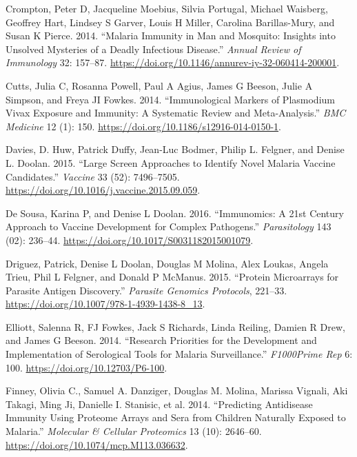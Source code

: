 \documentclass[
  a4paper]{article}
\begin{document}
\leavevmode\hypertarget{ref-crompton2014rev}{}%
Crompton, Peter D, Jacqueline Moebius, Silvia Portugal, Michael
Waisberg, Geoffrey Hart, Lindsey S Garver, Louis H Miller, Carolina
Barillas-Mury, and Susan K Pierce. 2014. ``Malaria Immunity in Man and
Mosquito: Insights into Unsolved Mysteries of a Deadly Infectious
Disease.'' \emph{Annual Review of Immunology} 32: 157--87.
\url{https://doi.org/10.1146/annurev-iy-32-060414-200001}.

\leavevmode\hypertarget{ref-cutts2014meta}{}%
Cutts, Julia C, Rosanna Powell, Paul A Agius, James G Beeson, Julie A
Simpson, and Freya JI Fowkes. 2014. ``Immunological Markers of
Plasmodium Vivax Exposure and Immunity: A Systematic Review and
Meta-Analysis.'' \emph{BMC Medicine} 12 (1): 150.
\url{https://doi.org/10.1186/s12916-014-0150-1}.

\leavevmode\hypertarget{ref-Davies2015Large}{}%
Davies, D. Huw, Patrick Duffy, Jean-Luc Bodmer, Philip L. Felgner, and
Denise L. Doolan. 2015. ``Large Screen Approaches to Identify Novel
Malaria Vaccine Candidates.'' \emph{Vaccine} 33 (52): 7496--7505.
\url{https://doi.org/10.1016/j.vaccine.2015.09.059}.

\leavevmode\hypertarget{ref-immunomics2016}{}%
De Sousa, Karina P, and Denise L Doolan. 2016. ``Immunomics: A 21st
Century Approach to Vaccine Development for Complex Pathogens.''
\emph{Parasitology} 143 (02): 236--44.
\url{https://doi.org/10.1017/S0031182015001079}.

\leavevmode\hypertarget{ref-Driguez2015}{}%
Driguez, Patrick, Denise L Doolan, Douglas M Molina, Alex Loukas, Angela
Trieu, Phil L Felgner, and Donald P McManus. 2015. ``Protein Microarrays
for Parasite Antigen Discovery.'' \emph{Parasite Genomics Protocols},
221--33. \url{https://doi.org/10.1007/978-1-4939-1438-8_13}.

\leavevmode\hypertarget{ref-elliott2014}{}%
Elliott, Salenna R, FJ Fowkes, Jack S Richards, Linda Reiling, Damien R
Drew, and James G Beeson. 2014. ``Research Priorities for the
Development and Implementation of Serological Tools for Malaria
Surveillance.'' \emph{F1000Prime Rep} 6: 100.
\url{https://doi.org/10.12703/P6-100}.

\leavevmode\hypertarget{ref-Finney2014}{}%
Finney, Olivia C., Samuel A. Danziger, Douglas M. Molina, Marissa
Vignali, Aki Takagi, Ming Ji, Danielle I. Stanisic, et al. 2014.
``Predicting Antidisease Immunity Using Proteome Arrays and Sera from
Children Naturally Exposed to Malaria.'' \emph{Molecular \& Cellular
Proteomics} 13 (10): 2646--60.
\url{https://doi.org/10.1074/mcp.M113.036632}.
\end{document}
